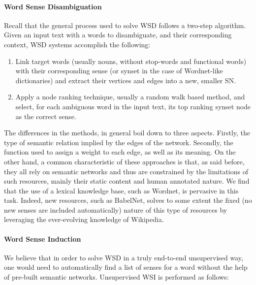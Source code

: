 \paragraph{Word Sense Disambiguation}

Recall that the general process used to solve WSD follows a two-step algorithm. Given an input text with a words to disambiguate, and their corresponding context, WSD systems accomplish the following:
\begin{enumerate}
\item Link target words (usually nouns, without stop-words and functional words) with their corresponding  sense (or synset in the case of Wordnet-like dictionaries) and extract their vertices and edges into a new, smaller SN. 
\item Apply a node ranking technique, usually a random walk based method, and select, for each ambiguous word in the input text,  its top ranking synset node as the correct sense.
\end{enumerate}


The differences in the methods, in general boil down to three aspects. Firstly, the type of semantic relation implied by the edges of the network. Secondly, the function used to  assign a weight to each edge, as well as its meaning. On the other hand, a common characteristic of these approaches is that, as said before, they all rely on semantic networks and thus are constrained by the limitations of such resources, mainly their static content and human annotated nature. We find that the use of a lexical knowledge base, such as Wordnet, is pervasive in this task. Indeed, new resources, such as BabelNet, solves to some extent the fixed (no new senses are included automatically) nature of this type of resources by leveraging the ever-evolving knowledge of Wikipedia. 

\paragraph{Word Sense Induction}We believe that in order to solve WSD in a truly end-to-end unsupervised way, one would need to automatically find a list of senses for a word without the help of pre-built semantic networks. 
Unsupervised WSI is performed as follows:


